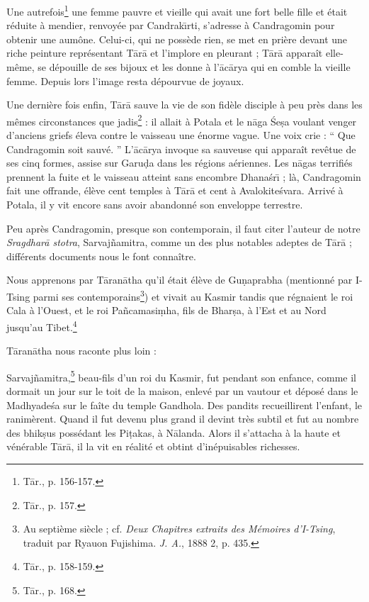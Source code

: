 \documentclass[a4paper, 11pt, oneside, french]{article}
\begin{document}
Une autrefois\footnote{T\={a}r., p. 156-157.} une femme pauvre et vieille qui avait une fort belle fille et était réduite à mendier, renvoyée par Candrak\={\i}rti, s'adresse à Candragomin pour obtenir une aumône. Celui-ci, qui ne possède rien, se met en prière devant une riche peinture représentant T\={a}r\={a} et l'implore en pleurant ; T\={a}r\={a} apparaît elle-même, se dépouille de ses bijoux et les donne à l'\={a}c\={a}rya qui en comble la vieille femme. Depuis lors l'image resta dépourvue de joyaux.

Une dernière fois enfin, T\={a}r\={a} sauve la vie de son fidèle disciple à peu près dans les mêmes circonstances que jadis\footnote{T\={a}r., p. 157.} : il allait à Potala et le n\={a}ga \'{S}e\d{s}a voulant venger d'anciens griefs éleva contre le vaisseau une énorme vague. Une voix crie : `` Que Candragomin soit sauvé. '' L'\={a}c\={a}rya invoque sa sauveuse qui apparaît revêtue de ses cinq formes, assise sur Garu\d{d}a dans les régions aériennes. Les n\={a}gas terrifiés prennent la fuite et le vaisseau atteint sans encombre Dhana\'{s}r\={\i} ; là, Candragomin fait une offrande, élève cent temples à T\={a}r\={a} et cent à Avalokite\'{s}vara. Arrivé à Potala, il y vit encore sans avoir abandonné son enveloppe terrestre.

Peu après Candragomin, presque son contemporain, il faut citer l'auteur de notre \emph{Sragdhar\={a} stotra}, Sarvaj\~{n}amitra, comme un des plus notables adeptes de T\={a}r\={a} ; différents documents nous le font connaître.

Nous apprenons par T\={a}ran\={a}tha qu'il était élève de Gu\d{n}aprabha (mentionné par I-Tsing parmi ses contemporains\footnote{Au septième siècle ; cf. \emph{Deux Chapitres extraits des Mémoires d'I-Tsing}, traduit par Ryauon Fujishima. \emph{J. A.}, 1888 2, p. 435.}) et vivait au Kasmir tandis que régnaient le roi Cala à l'Ouest, et le roi Pa\~{n}camasi\d{m}ha, fils de Bhar\d{s}a, à l'Est et au Nord jusqu'au Tibet.\footnote{T\={a}r., p. 158-159.}

T\={a}ran\={a}tha nous raconte plus loin :

Sarvaj\~{n}amitra,\footnote{T\={a}r., p. 168.} beau-fils d'un roi du Kasmir, fut pendant son enfance, comme il dormait un jour sur le toit de la maison, enlevé par un vautour et déposé dans le Madhyade\'{s}a sur le faîte du temple Gandhola. Des pandits recueillirent l'enfant, le ranimèrent. Quand il fut devenu plus grand il devint très subtil et fut au nombre des bhik\d{s}us possédant les Pi\d{t}akas, à N\={a}landa. Alors il s'attacha à la haute et vénérable T\={a}r\={a}, il la vit en réalité et obtint d'inépuisables richesses.
\end{document}
